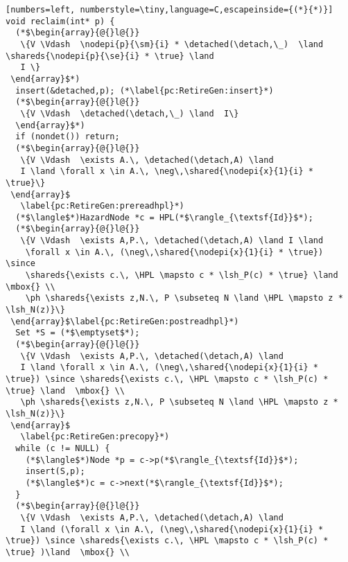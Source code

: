 
\begin{figure*}[t]
{\figfontsize
\begin{lstlisting}[numbers=left, numberstyle=\tiny,language=C,escapeinside={(*}{*)}]
void reclaim(int* p) {  
  (*$\begin{array}{@{}l@{}}  
   \{V \Vdash  \nodepi{p}{\sm}{i} * \detached(\detach,\_)  \land \shareds{\nodepi{p}{\se}{i} * \true} \land 
   I \}
 \end{array}$*) 
  insert(&detached,p); (*\label{pc:RetireGen:insert}*)
  (*$\begin{array}{@{}l@{}}
   \{V \Vdash  \detached(\detach,\_) \land  I\}
  \end{array}$*) 
  if (nondet()) return;
  (*$\begin{array}{@{}l@{}} 
   \{V \Vdash  \exists A.\, \detached(\detach,A) \land  
   I \land \forall x \in A.\, \neg\,\shared{\nodepi{x}{1}{i} * \true}\}
 \end{array}$
   \label{pc:RetireGen:prereadhpl}*)     
  (*$\langle$*)HazardNode *c = HPL(*$\rangle_{\textsf{Id}}$*);
  (*$\begin{array}{@{}l@{}} 
   \{V \Vdash  \exists A,P.\, \detached(\detach,A) \land I \land  
    \forall x \in A.\, (\neg\,\shared{\nodepi{x}{1}{i} * \true}) \since
    \shareds{\exists c.\, \HPL \mapsto c * \lsh_P(c) * \true} \land \mbox{} \\
    \ph \shareds{\exists z,N.\, P \subseteq N \land \HPL \mapsto z * \lsh_N(z)}\}
 \end{array}$\label{pc:RetireGen:postreadhpl}*)     
  Set *S = (*$\emptyset$*);
  (*$\begin{array}{@{}l@{}} 
   \{V \Vdash  \exists A,P.\, \detached(\detach,A) \land  
   I \land \forall x \in A.\, (\neg\,\shared{\nodepi{x}{1}{i} * \true}) \since \shareds{\exists c.\, \HPL \mapsto c * \lsh_P(c) * \true} \land  \mbox{} \\
   \ph \shareds{\exists z,N.\, P \subseteq N \land \HPL \mapsto z * \lsh_N(z)}\}
 \end{array}$
   \label{pc:RetireGen:precopy}*)     
  while (c != NULL) {
    (*$\langle$*)Node *p = c->p(*$\rangle_{\textsf{Id}}$*);  
    insert(S,p);
    (*$\langle$*)c = c->next(*$\rangle_{\textsf{Id}}$*);       
  }
  (*$\begin{array}{@{}l@{}} 
   \{V \Vdash  \exists A,P.\, \detached(\detach,A) \land  
   I \land (\forall x \in A.\, (\neg\,\shared{\nodepi{x}{1}{i} * \true}) \since \shareds{\exists c.\, \HPL \mapsto c * \lsh_P(c) * \true} )\land  \mbox{} \\

\end{lstlisting}}
\end{figure*}
